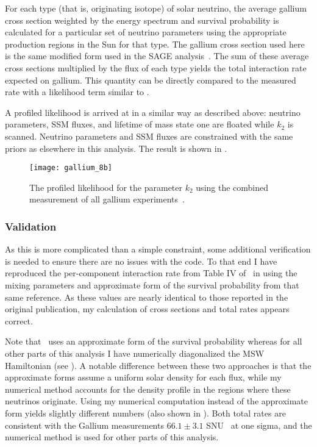 For each type (that is, originating isotope) of solar neutrino, the average gallium cross section weighted by the energy spectrum and survival probability is calculated for a particular set of neutrino parameters using the appropriate production regions in the Sun for that type.
The gallium cross section used here is the same modified form used in the SAGE analysis~\cite{sagecombo}.
The sum of these average cross sections multiplied by the flux of each type yields the total interaction rate expected on gallium.
This quantity can be directly compared to the measured rate with a likelihood term similar to .

A profiled likelihood is arrived at in a similar way as described above: neutrino parameters, SSM fluxes, and lifetime of mass state one are floated while $k_2$ is scanned. 
Neutrino parameters and SSM fluxes are constrained with the same priors as elsewhere in this analysis.
The result is shown in .

\begin{figure}
\centering
\texttt{[image: gallium\_8b]}
\caption{The profiled likelihood for the parameter $k_2$ using the combined measurement of all gallium experiments~\cite{sagecombo}.}
\label{fig:ga_profiles}
\end{figure}

\subsubsection{Validation}

As this is more complicated than a simple constraint, some additional verification is needed to ensure there are no issues with the code.
To that end I have reproduced the per-component interaction rate from Table IV of~\cite{sagecombo} in  using the mixing parameters and approximate form of the survival probability from that same reference.
As these values are nearly identical to those reported in the original publication, my calculation of cross sections and total rates appears correct.

Note that~\cite{sagecombo} uses an approximate form of the survival probability whereas for all other parts of this analysis I have numerically diagonalized the MSW Hamiltonian (see ).
A notable difference between these two approaches is that the approximate forms assume a uniform solar density for each flux, while my numerical method accounts for the density profile in the regions where these neutrinos originate.
Using my numerical computation instead of the approximate form yields slightly different numbers (also shown in ). 
Both total rates are consistent with the Gallium measurements $66.1\pm3.1$ SNU~\cite{sagecombo} at one sigma, and the numerical method is used for other parts of this analysis.

